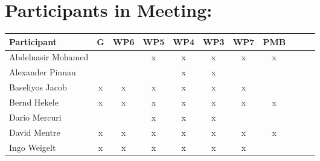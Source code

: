 \documentclass[a4paper, 11pt]{article}
\begin{document}
\section{Participants in Meeting:}

\begin{tabular}{|l|c|c|c|c|c|c|c|c|c|c|}
\hline
\textbf{Participant}  & \textbf{G} & \textbf{WP6} &  \textbf{WP5} & \textbf{WP4}&  \textbf{WP3} & \textbf{WP7}&  \textbf{PMB} \\\hline
Abdelnasir Mohamed    &  &   & x & x  & x &x  &x  \\\hline 
Alexander Pinnau      &   &   &   & x & x &  &  \\\hline  
Baseliyos Jacob       & x & x & x & x & x & x &  \\\hline 
Bernd Hekele          & x & x & x & x & x & x & x \\\hline
Dario Mercuri         &   &   & x & x & x &  &   \\\hline
David Mentre          & x & x & x & x & x & x & x \\\hline
Ingo Weigelt          & x & x & x & x & x & x &   \\\hline

\end{tabular}
\end{document}
